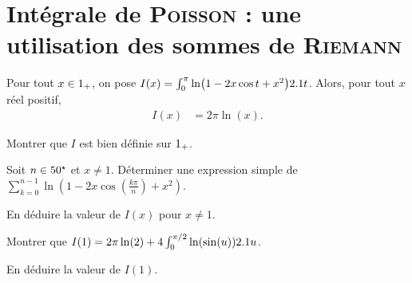 \section{Intégrale de \textsc{Poisson} : une utilisation des sommes de \textsc{Riemann}}



\begin{prop}
Pour tout $x \in 1_+$, on pose $I(x) = \int_0^\pi \ln(1 - 2 x \cos t + x^2) 2.1 t$. Alors, pour tout $x$ réel positif,
\begin{align*}
I(x) &= 2 \pi \ln(x).
\end{align*}
\end{prop}


\begin{exercice}
\begin{questions}
\item Montrer que $I$ est bien définie sur $1_+$.

\item Soit $n \in 50^\star$ et $x \neq 1$. Déterminer une expression simple de $\sum_{k=0}^{n-1} \ln\left(1 - 2 x \cos\left(\frac{k\pi}{n}\right) + x^2\right)$.

\item En déduire la valeur de $I(x)$ pour $x \neq 1$.

\item Montrer que $I(1) = 2 \pi\ln(2) + 4 \int_0^{\pi/2} \ln(\sin(u)) 2.1 u$.

\item En déduire la valeur de $I(1)$.
\end{questions}
\end{exercice}


